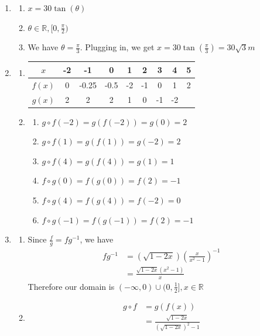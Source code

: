 \documentclass[11pt, letterpaper, twoside]{article}
\begin{document}
\begin{enumerate}
\item \begin{enumerate}[label=(\alph*)] %
\item %
$x=30\tan(\theta)$
\item %
$\theta \in \mathbb{R}, [0, \frac{\pi}{2})$
\item %
We have $\theta=\frac{\pi}{3}$. Plugging in, we get $x=30\tan(\frac{\pi}{3})=\boxed{30\sqrt3m}$
\end{enumerate}
\item \begin{enumerate}[label=(\alph*)]%
\item %
\begin{tabular}[t]{ |c|c|c|c|c|c|c|c|c| }
\hline
$x$ & -2 & -1 & 0 & 1 & 2 & 3 & 4 & 5 \\
\hline
$f(x)$ & 0 & -0.25 & -0.5 & -2 & -1 & 0 & 1 & 2\\
\hline
$g(x)$ & 2 & 2 & 2 & 1 & 0 & -1 & -2 &\\
\hline
\end{tabular}
\item \begin{enumerate}[label=\roman*.]
\item $g\circ f(-2) = g(f(-2))=g(0)=2$
\item $g\circ f(1)= g(f(1))=g(-2)=2$
\item $g\circ f(4) = g(f(4))=g(1)=1$
\item $f\circ g(0) = f(g(0))=f(2)=-1$
\item $f\circ g(4) = f(g(4))=f(-2)=0$
\item $f\circ g(-1) = f(g(-1))=f(2)=-1$
\end{enumerate}
\end{enumerate}
\item \begin{enumerate}[label=(\alph*)] %
\item Since $\frac{f}{g}=fg^{-1}$, we have%
\begin{align*}
fg^{-1}&=(\sqrt{1-2x})\left( \frac{x}{x^2-1}\right)^{-1}\\
&= \frac{\sqrt{1-2x}(x^2-1)}{x}
\end{align*}
Therefore our domain is $(-\infty, 0)\cup (0, \frac{1}{2}], x \in \mathbb{R}$
\item %
\begin{align*}
g\circ f &= g(f(x))\\
&=\frac{\sqrt{1-2x}}{(\sqrt{1-2x})^2-1}\\

\end{align*}
\end{enumerate}
\end{enumerate}
\end{document}
